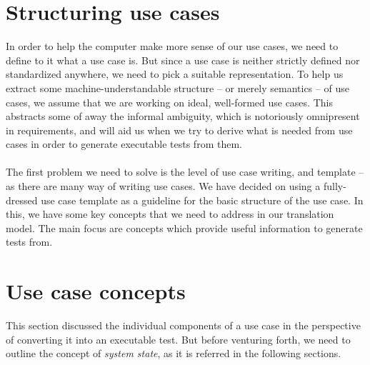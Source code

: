 \section{Structuring use cases}
In order to help the computer make more sense of our use cases, we need to define to it what a use case is. But since a use case is neither strictly defined nor standardized anywhere, we need to pick a suitable representation.
To help us extract some machine-understandable structure -- or merely semantics -- of use cases, we assume that we are working on ideal, well-formed use cases. This abstracts some of away the informal ambiguity, which is notoriously omnipresent in requirements, and will aid us when we try to derive what is needed from use cases in order to generate executable tests from them.\\\\
The first problem we need to solve is the level of use case writing, and template -- as there are many way of writing use cases. 
We have decided on using a fully-dressed use case template\cite{larman2005} as a guideline for the basic structure of the use case. In this, we have some key concepts that we need to address in our translation model. The main focus are concepts which provide useful information to generate tests from.

\section{Use case concepts}
This section discussed the individual components of a use case in the perspective of converting it into an executable test. But before venturing forth, we need to outline the concept of \emph{system state}, as it is referred in the following sections.

